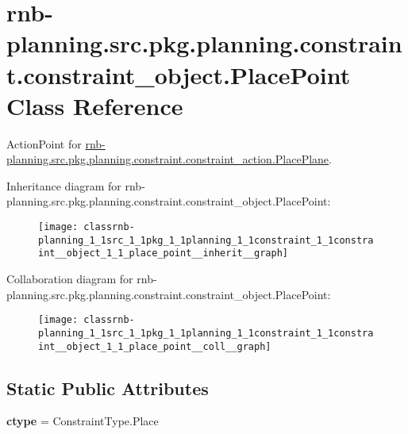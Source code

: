 \hypertarget{classrnb-planning_1_1src_1_1pkg_1_1planning_1_1constraint_1_1constraint__object_1_1_place_point}{}\section{rnb-\/planning.src.\+pkg.\+planning.\+constraint.\+constraint\+\_\+object.\+Place\+Point Class Reference}
\label{classrnb-planning_1_1src_1_1pkg_1_1planning_1_1constraint_1_1constraint__object_1_1_place_point}


Action\+Point for \hyperlink{classrnb-planning_1_1src_1_1pkg_1_1planning_1_1constraint_1_1constraint__action_1_1_place_plane}{rnb-\/planning.\+src.\+pkg.\+planning.\+constraint.\+constraint\+\_\+action.\+Place\+Plane}.  




Inheritance diagram for rnb-\/planning.src.\+pkg.\+planning.\+constraint.\+constraint\+\_\+object.\+Place\+Point\+:\nopagebreak
\begin{figure}[H]
\begin{center}
\leavevmode
\texttt{[image: classrnb-planning\_1\_1src\_1\_1pkg\_1\_1planning\_1\_1constraint\_1\_1constraint\_\_object\_1\_1\_place\_point\_\_inherit\_\_graph]}
\end{center}
\end{figure}


Collaboration diagram for rnb-\/planning.src.\+pkg.\+planning.\+constraint.\+constraint\+\_\+object.\+Place\+Point\+:\nopagebreak
\begin{figure}[H]
\begin{center}
\leavevmode
\texttt{[image: classrnb-planning\_1\_1src\_1\_1pkg\_1\_1planning\_1\_1constraint\_1\_1constraint\_\_object\_1\_1\_place\_point\_\_coll\_\_graph]}
\end{center}
\end{figure}
\subsection*{Static Public Attributes}
\begin{DoxyCompactItemize}
\item 
\mbox{\label{classrnb-planning_1_1src_1_1pkg_1_1planning_1_1constraint_1_1constraint__object_1_1_place_point_a414eed0343ffb1436896c236424b7b55}} 
{\bfseries ctype} = Constraint\+Type.\+Place
\end{DoxyCompactItemize}
